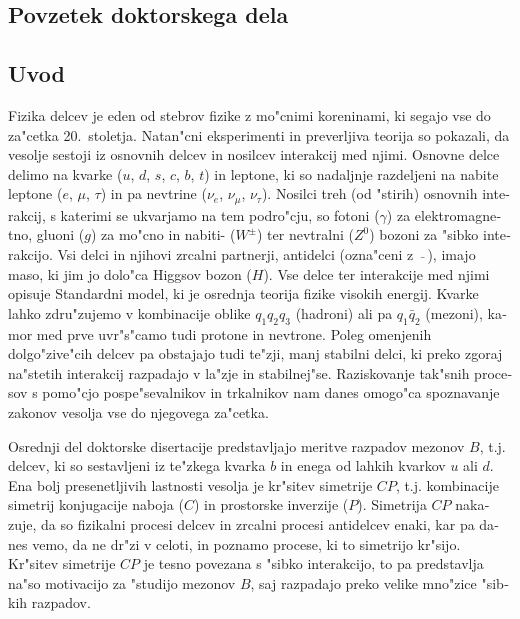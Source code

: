 \begin{otherlanguage}{slovene}
\chapter{Povzetek doktorskega dela}
\section{Uvod}
Fizika delcev je eden od stebrov fizike z mo"cnimi koreninami, ki segajo vse do za"cetka 20.~stoletja. Natan"cni eksperimenti in preverljiva teorija so pokazali, da vesolje sestoji iz osnovnih delcev in nosilcev interakcij med njimi. Osnovne delce delimo na kvarke ($u$, $d$, $s$, $c$, $b$, $t$) in leptone, ki so nadaljnje razdeljeni na nabite leptone ($e$, $\mu$, $\tau$) in pa nevtrine ($\nu_e$, $\nu_\mu$, $\nu_\tau$). Nosilci treh (od "stirih) osnovnih interakcij, s katerimi se ukvarjamo na tem podro"cju, so fotoni ($\gamma$) za elektromagnetno, gluoni ($g$) za mo"cno in nabiti- ($W^\pm$) ter nevtralni ($Z^0$) bozoni za "sibko interakcijo. Vsi delci in njihovi zrcalni partnerji, antidelci (ozna"ceni z $~\bar {}~$), imajo maso, ki jim jo dolo"ca Higgsov bozon ($H$). Vse delce ter interakcije med njimi opisuje Standardni model, ki je osrednja teorija fizike visokih energij. Kvarke lahko zdru"zujemo v kombinacije oblike $q_1 q_2 q_3$ (hadroni) ali pa $q_1 \bar{q}_2$ (mezoni), kamor med prve uvr"s"camo tudi protone in nevtrone. Poleg omenjenih dolgo"zive"cih delcev pa obstajajo tudi te"zji, manj stabilni delci, ki preko zgoraj na"stetih interakcij razpadajo v la"zje in stabilnej"se. Raziskovanje tak"snih procesov s pomo"cjo pospe"sevalnikov in trkalnikov nam danes omogo"ca spoznavanje zakonov vesolja vse do njegovega za"cetka.

Osrednji del doktorske disertacije predstavljajo meritve razpadov mezonov $B$, t.j. delcev, ki so sestavljeni iz te"zkega kvarka $b$ in enega od lahkih kvarkov $u$ ali $d$. Ena bolj presenetljivih lastnosti vesolja je kr"sitev simetrije $CP$, t.j. kombinacije simetrij konjugacije naboja ($C$) in prostorske inverzije ($P$). Simetrija $CP$ nakazuje, da so fizikalni procesi delcev in zrcalni procesi antidelcev enaki, kar pa danes vemo, da ne dr"zi v celoti, in poznamo procese, ki to simetrijo kr"sijo. Kr"sitev simetrije $CP$ je tesno povezana s "sibko interakcijo, to pa predstavlja na"so motivacijo za "studijo mezonov $B$, saj razpadajo preko velike mno"zice "sibkih razpadov.


\end{otherlanguage}
